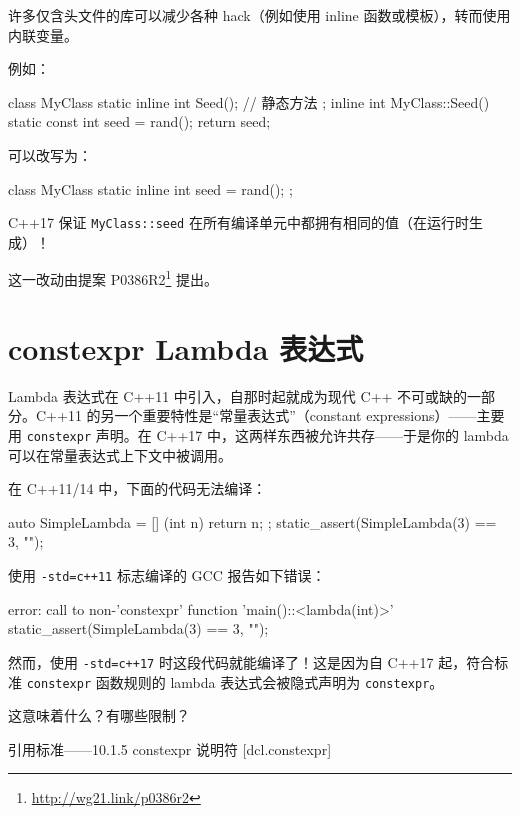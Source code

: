 许多仅含头文件的库可以减少各种 hack（例如使用 inline 函数或模板），转而使用内联变量。

例如：

\begin{codebox}[cpp]
class MyClass
{
static inline int Seed(); // 静态方法
};
inline int MyClass::Seed() {
static const int seed = rand();
return seed;
}
\end{codebox}

可以改写为：

\begin{codebox}[cpp]
class MyClass
{
static inline int seed = rand();
};
\end{codebox}

C++17 保证 \texttt{MyClass::seed} 在所有编译单元中都拥有相同的值（在运行时生成）！

\begin{myInfoBox}
这一改动由提案 P0386R2\footnote{\url{http://wg21.link/p0386r2}} 提出。
\end{myInfoBox}

\section{constexpr Lambda 表达式}

Lambda 表达式在 C++11 中引入，自那时起就成为现代 C++ 不可或缺的一部分。C++11 的另一个重要特性是“常量表达式”（constant expressions）——主要用 \texttt{constexpr} 声明。在 C++17 中，这两样东西被允许共存——于是你的 lambda 可以在常量表达式上下文中被调用。

在 C++11/14 中，下面的代码无法编译：

\begin{codebox}[cpp]
auto SimpleLambda = [] (int n)
{ return n; };
static_assert(SimpleLambda(3) == 3, "");
\end{codebox}

使用 \texttt{-std=c++11} 标志编译的 GCC 报告如下错误：

\begin{codebox}
error: call to non-'constexpr' function 'main()::<lambda(int)>'
static_assert(SimpleLambda(3) == 3, "");
\end{codebox}

然而，使用 \texttt{-std=c++17} 时这段代码就能编译了！这是因为自 C++17 起，符合标准 \texttt{constexpr} 函数规则的 lambda 表达式会被隐式声明为 \texttt{constexpr}。

这意味着什么？有哪些限制？

引用标准——10.1.5 constexpr 说明符 [dcl.constexpr]

